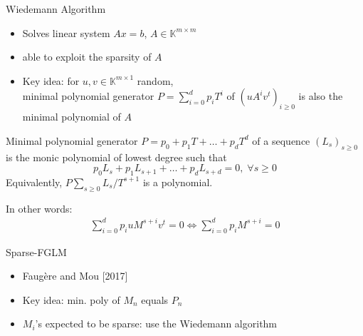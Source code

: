 \documentclass{beamer}
\begin{document}
\begin{frame}{Wiedemann Algorithm}
	\begin{itemize}
		\item Solves linear system $Ax = b$, $A \in \mathbb{K}^{m\times m}$
		\item able to exploit the sparsity of $A$
		\item Key idea: for $u,v \in \mathbb{K}^{m\times 1}$ random,\\
		minimal polynomial generator 
		$P = \sum_{i=0}^{d} p_i T^i$
		of $(u A^i v^{t})_{i\ge 0}$ is also the minimal polynomial of $A$
	\end{itemize}
	\pause
	\begin{definition}
		Minimal polynomial generator $P = p_0 + p_1 T + \dots + p_d T^d$ of a
		sequence $(L_s)_{s\ge0}$ is the monic polynomial of lowest degree such
		that 
		$$ p_0 L_s + p_1 L_{s+1} + \dots + p_d L_{s+d} = 0, \; \forall s \ge 0$$
		Equivalently, $P \sum_{s\ge 0} L_s/ T^{s+1}$ is a polynomial. 
	\end{definition}
	
	In other words:
	\begin{align*}
	\sum_{i=0}^{d}p_i u M^{s+i} v^{t} = 0 \iff \sum_{i=0}^{d}p_i M^{s+i}  = 0
	\end{align*}
\end{frame}

\begin{frame}{Sparse-FGLM}
	\begin{itemize}
		\item Faug\`ere and Mou [2017]
		\item Key idea: min. poly of $M_n$ equals $P_n$
		\item $M_i$'s expected to be sparse: use the Wiedemann algorithm
	\end{itemize}
	
	
\end{frame}
\end{document}
